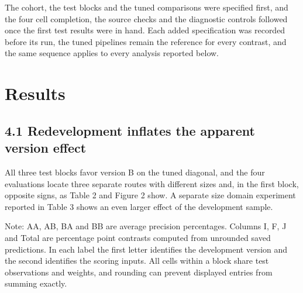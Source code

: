 \documentclass[10pt,a4paper,twocolumn]{article}
\begin{document}
The cohort, the test blocks and the tuned comparisons were specified first, and the four cell completion, the source checks and the diagnostic controls followed once the first test results were in hand. Each added specification was recorded before its run, the tuned pipelines remain the reference for every contrast, and the same sequence applies to every analysis reported below.
\section{Results}
\subsection{4.1 Redevelopment inflates the apparent version effect}

All three test blocks favor version B on the tuned diagonal, and the four evaluations locate three separate routes with different sizes and, in the first block, opposite signs, as Table 2 and Figure 2 show. A separate size domain experiment reported in Table 3 shows an even larger effect of the development sample.

\begin{table}[tbp]
\centering
\footnotesize
\caption{Table 2. Crossed version validation matrix and decomposition of the tuned LightGBM difference.}
\label{main-tab-1}
\end{table}

Note: AA, AB, BA and BB are average precision percentages. Columns I, F, J and Total are percentage point contrasts computed from unrounded saved predictions. In each label the first letter identifies the development version and the second identifies the scoring inputs. All cells within a block share test observations and weights, and rounding can prevent displayed entries from summing exactly.

\par\vspace{4pt}\par\vspace{4pt}
\end{document}
